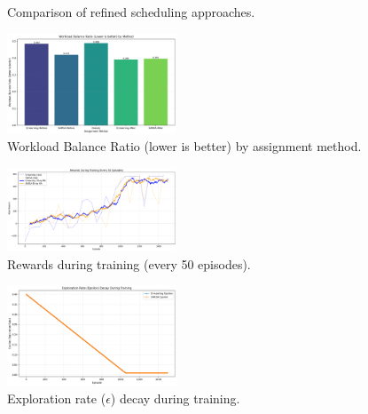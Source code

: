 \documentclass[%
aip,
cp,  %
amsmath,amssymb,
reprint,%
]{revtex4-2}
\begin{document}
	\begin{figure}
		\centering
		\hfill
		\caption{\label{fig:refined}Comparison of refined scheduling approaches.}
	\end{figure}
	
	\begin{figure}
		\centering
		\includegraphics[width=0.45\textwidth]{figures/Workload_Balance_Ratio.png}
		\caption{\label{fig:workload_balance_ratio}Workload Balance Ratio (lower is better) by assignment method.}
	\end{figure}
	
	\begin{figure}
		\centering
		\includegraphics[width=0.45\textwidth]{figures/Rewards_During_Training.png}
		\caption{\label{fig:rewards_training}Rewards during training (every 50 episodes).}
	\end{figure}
	
	\begin{figure}
		\centering
		\includegraphics[width=0.45\textwidth]{figures/Epsilon_Decay.png}
		\caption{\label{fig:epsilon_decay}Exploration rate ($\epsilon$) decay during training.}
	\end{figure}
	
\end{document}
